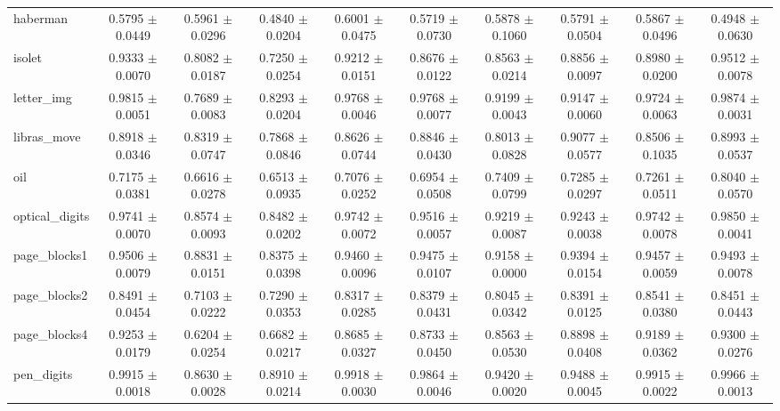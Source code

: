 \begin{table*}[htbp]
\begin{tabular}{lccccccccc}
            haberman & 0.5795 $\pm$ 0.0449 & 0.5961 $\pm$ 0.0296 & 0.4840 $\pm$ 0.0204 & 0.6001 $\pm$ 0.0475 & 0.5719 $\pm$ 0.0730 & 0.5878 $\pm$ 0.1060 & 0.5791 $\pm$ 0.0504 & 0.5867 $\pm$ 0.0496 & 0.4948 $\pm$ 0.0630 \\ 
            isolet & 0.9333 $\pm$ 0.0070 & 0.8082 $\pm$ 0.0187 & 0.7250 $\pm$ 0.0254 & 0.9212 $\pm$ 0.0151 & 0.8676 $\pm$ 0.0122 & 0.8563 $\pm$ 0.0214 & 0.8856 $\pm$ 0.0097 & 0.8980 $\pm$ 0.0200 & 0.9512 $\pm$ 0.0078 \\ 
            letter\_img & 0.9815 $\pm$ 0.0051 & 0.7689 $\pm$ 0.0083 & 0.8293 $\pm$ 0.0204 & 0.9768 $\pm$ 0.0046 & 0.9768 $\pm$ 0.0077 & 0.9199 $\pm$ 0.0043 & 0.9147 $\pm$ 0.0060 & 0.9724 $\pm$ 0.0063 & 0.9874 $\pm$ 0.0031 \\ 
            libras\_move & 0.8918 $\pm$ 0.0346 & 0.8319 $\pm$ 0.0747 & 0.7868 $\pm$ 0.0846 & 0.8626 $\pm$ 0.0744 & 0.8846 $\pm$ 0.0430 & 0.8013 $\pm$ 0.0828 & 0.9077 $\pm$ 0.0577 & 0.8506 $\pm$ 0.1035 & 0.8993 $\pm$ 0.0537 \\ 
            oil & 0.7175 $\pm$ 0.0381 & 0.6616 $\pm$ 0.0278 & 0.6513 $\pm$ 0.0935 & 0.7076 $\pm$ 0.0252 & 0.6954 $\pm$ 0.0508 & 0.7409 $\pm$ 0.0799 & 0.7285 $\pm$ 0.0297 & 0.7261 $\pm$ 0.0511 & 0.8040 $\pm$ 0.0570 \\ 
            optical\_digits & 0.9741 $\pm$ 0.0070 & 0.8574 $\pm$ 0.0093 & 0.8482 $\pm$ 0.0202 & 0.9742 $\pm$ 0.0072 & 0.9516 $\pm$ 0.0057 & 0.9219 $\pm$ 0.0087 & 0.9243 $\pm$ 0.0038 & 0.9742 $\pm$ 0.0078 & 0.9850 $\pm$ 0.0041 \\ 
            page\_blocks1 & 0.9506 $\pm$ 0.0079 & 0.8831 $\pm$ 0.0151 & 0.8375 $\pm$ 0.0398 & 0.9460 $\pm$ 0.0096 & 0.9475 $\pm$ 0.0107 & 0.9158 $\pm$ 0.0000 & 0.9394 $\pm$ 0.0154 & 0.9457 $\pm$ 0.0059 & 0.9493 $\pm$ 0.0078 \\
            page\_blocks2 & 0.8491 $\pm$ 0.0454 & 0.7103 $\pm$ 0.0222 & 0.7290 $\pm$ 0.0353 & 0.8317 $\pm$ 0.0285 & 0.8379 $\pm$ 0.0431 & 0.8045 $\pm$ 0.0342 & 0.8391 $\pm$ 0.0125 & 0.8541 $\pm$ 0.0380 & 0.8451 $\pm$ 0.0443 \\ 
            page\_blocks4 & 0.9253 $\pm$ 0.0179 & 0.6204 $\pm$ 0.0254 & 0.6682 $\pm$ 0.0217 & 0.8685 $\pm$ 0.0327 & 0.8733 $\pm$ 0.0450 & 0.8563 $\pm$ 0.0530 & 0.8898 $\pm$ 0.0408 & 0.9189 $\pm$ 0.0362 & 0.9300 $\pm$ 0.0276 \\
            pen\_digits & 0.9915 $\pm$ 0.0018 & 0.8630 $\pm$ 0.0028 & 0.8910 $\pm$ 0.0214 & 0.9918 $\pm$ 0.0030 & 0.9864 $\pm$ 0.0046 & 0.9420 $\pm$ 0.0020 & 0.9488 $\pm$ 0.0045 & 0.9915 $\pm$ 0.0022 & 0.9966 $\pm$ 0.0013 \\ 

\end{tabular}
\end{table*}
